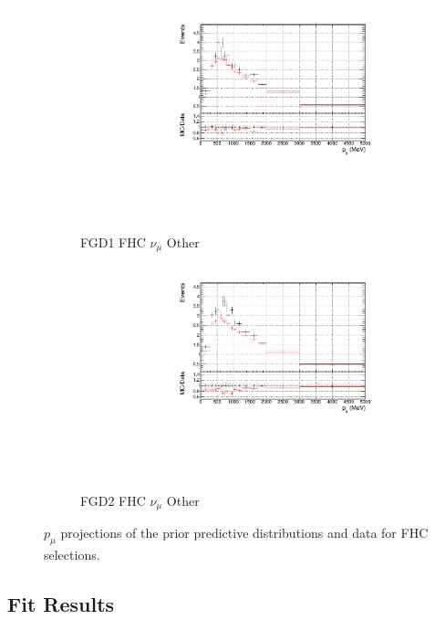 \begin{figure}[!h]
\begin{subfigure}{0.49\textwidth}
  \centering
  \includegraphics[width=\textwidth]{figs/prioronly1D_p_FGD1_numuCC_other}
  \caption{FGD1 FHC $\nu_{\mu}$ Other}
\end{subfigure}
\begin{subfigure}{0.49\textwidth}
  \centering
  \includegraphics[width=\textwidth]{figs/prioronly1D_p_FGD2_numuCC_other}
  \caption{FGD2 FHC $\nu_{\mu}$ Other}
  \label{fig:priorpost_FGD2_numuCC_other}
\end{subfigure}
\caption{$p_{\mu}$ projections of the prior predictive distributions and data for FHC \numu selections.}
\label{fig:priorpost_fhc_p}
\end{figure}

\subsection{Fit Results}

